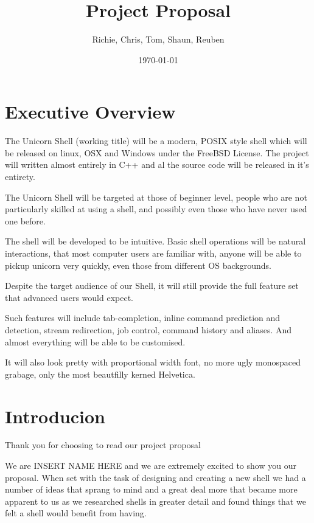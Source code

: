 \documentclass[a4paper,11pt]{article}
\title{Project Proposal}
\author{Richie, Chris, Tom, Shaun, Reuben}
\date{\today}
\begin{document}
\maketitle


\section{Executive Overview}

The Unicorn Shell (working title) will be a modern, POSIX style shell which will be released on linux, OSX and Windows under the FreeBSD License. The project will written almost entirely in C++ and al the source code will be released in it's entirety.

The Unicorn Shell will be targeted at those of beginner level, people who are not particularly skilled at using a shell, and possibly even those who have never used one before.

The shell will be developed to be intuitive. Basic shell operations will be natural interactions, that most computer users are familiar with, anyone will be able to pickup unicorn very quickly, even those from different OS backgrounds.

Despite the target audience of our Shell, it will still provide the full feature set that advanced users would expect.

Such features will include tab-completion, inline command prediction and detection, stream redirection, job control,  command history and aliases. And almost everything will be able to be customised.

It will also look pretty with proportional width font, no more ugly monospaced grabage, only the most beautfilly kerned Helvetica. 

\section{Introducion}
Thank you for choosing to read our project proposal

We are INSERT NAME HERE and we are extremely excited to show you our proposal. When set with the task of designing and creating a new shell we had a number of ideas that sprang to mind and a great deal more that became more apparent to us as we researched shells in greater detail and found things that we felt a shell would benefit from having.
\pagebreak
\end{document}
